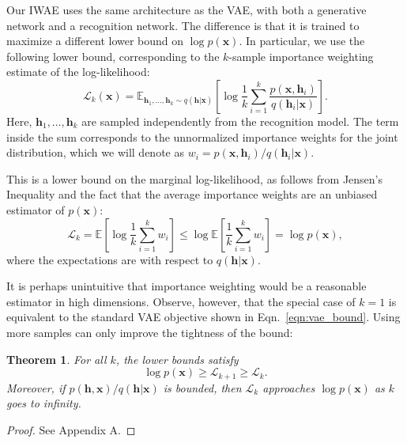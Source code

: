 \documentclass{article} %
\newtheorem{theorem}{Theorem}
\newcommand{\expect}{\mathbb{E}}
\newcommand{\hid}{\mathbf{h}}
\newcommand{\hidS}[1]{\hid_{#1}}
\newcommand{\obs}{\mathbf{x}}
\newcommand{\pmfGen}{p}
\newcommand{\pmfRec}{q}
\newcommand{\varBound}{\mathcal{L}}
\newcommand{\numSamples}{k}
\newcommand{\sampleIdx}{i}
\newcommand{\isWeight}{w}
\newcommand{\isWeightS}[1]{\isWeight_{#1}}
\newcommand{\isBoundK}[1]{\mathcal{L}_{#1}}
\begin{document}
Our IWAE uses the same architecture as the VAE, with both a generative network and a recognition network. The difference is that it is trained to maximize a different lower bound on $\log \pmfGen(\obs)$. In particular, we use the following lower bound, corresponding to the $\numSamples$-sample importance weighting estimate of the log-likelihood:
\begin{equation}
\isBoundK{\numSamples}(\obs)=\expect_{\hidS{1},\ldots,\hidS{\numSamples} \sim \pmfRec(\hid | \obs)} \left[ \log \frac{1}{\numSamples} \sum_{\sampleIdx=1}^\numSamples \frac{\pmfGen(\obs,\hidS{\sampleIdx})}{\pmfRec(\hidS{\sampleIdx}|\obs)} \right]. \label{eqn:is_bound}
\end{equation}
Here, $\hidS{1}, \ldots, \hidS{\numSamples}$ are sampled independently from the recognition model. The term inside the sum corresponds to the unnormalized importance weights for the joint distribution, which we will denote as $\isWeightS{\sampleIdx}=\pmfGen(\obs,\hidS{\sampleIdx}) / \pmfRec(\hidS{\sampleIdx}|\obs)$.

This is a lower bound on the marginal log-likelihood, as follows from Jensen's Inequality and the fact that the average importance weights are an unbiased estimator of $\pmfGen(\obs)$:
\begin{equation}
\isBoundK{\numSamples}=\expect \left[ \log \frac{1}{\numSamples} \sum_{\sampleIdx=1}^\numSamples \isWeightS{\sampleIdx} \right] \leq \log \expect \left[ \frac{1}{\numSamples} \sum_{\sampleIdx=1}^\numSamples \isWeightS{\sampleIdx} \right] =\log \pmfGen(\obs),
\end{equation}
where the expectations are with respect to $\pmfRec(\hid | \obs)$.

It is perhaps unintuitive that importance weighting would be a reasonable estimator in high dimensions. Observe, however, that the special case of $\numSamples=1$ is equivalent to the standard VAE objective shown in Eqn.~\ref{eqn:vae_bound}. Using more samples can only improve the tightness of the bound:
\begin{theorem}
For all $\numSamples$, the lower bounds satisfy
\begin{equation}
\log \pmfGen(\obs) \geq \isBoundK{\numSamples + 1} \geq \isBoundK{\numSamples}.
\end{equation}
Moreover, if $\pmfGen(\hid, \obs) / \pmfRec(\hid | \obs)$ is bounded, then $\isBoundK{\numSamples}$ approaches $\log \pmfGen(\obs)$ as $\numSamples$ goes to infinity.
\end{theorem}
\begin{proof}
See Appendix A.
\end{proof}
\end{document}
